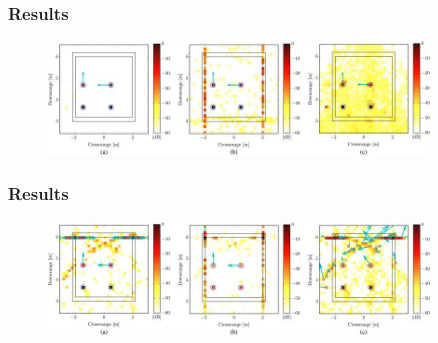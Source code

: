 \documentclass[cjk]{beamer}
\begin{document}
  \begin{frame}
	\frametitle{Results}
	\begin{figure}
	  \centering
	  \includegraphics[width=0.9\textwidth]{fig5.jpg}
	\end{figure}
  \end{frame}
  \begin{frame}
	\frametitle{Results}
	\begin{figure}
	  \centering
	  \includegraphics[width=0.9\textwidth]{fig6.jpg}
	\end{figure}
  \end{frame}
\end{document}
